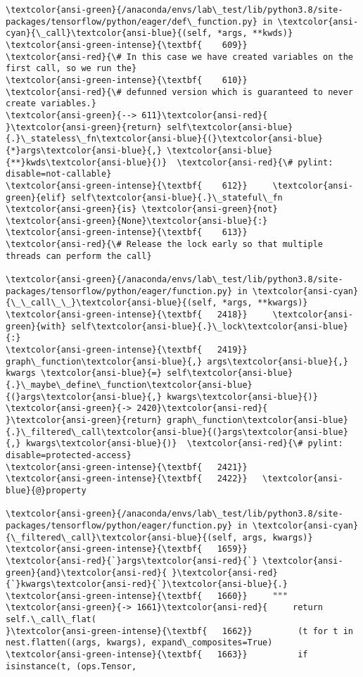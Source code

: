 \documentclass[11pt]{article}
\begin{document}
\begin{Verbatim}[commandchars=\\\{\}, frame=single, framerule=2mm, rulecolor=\color{outerrorbackground}]
\textcolor{ansi-green}{/anaconda/envs/lab\_test/lib/python3.8/site-packages/tensorflow/python/eager/def\_function.py} in \textcolor{ansi-cyan}{\_call}\textcolor{ansi-blue}{(self, *args, **kwds)}
\textcolor{ansi-green-intense}{\textbf{    609}}       \textcolor{ansi-red}{\# In this case we have created variables on the first call, so we run the}
\textcolor{ansi-green-intense}{\textbf{    610}}       \textcolor{ansi-red}{\# defunned version which is guaranteed to never create variables.}
\textcolor{ansi-green}{--> 611}\textcolor{ansi-red}{       }\textcolor{ansi-green}{return} self\textcolor{ansi-blue}{.}\_stateless\_fn\textcolor{ansi-blue}{(}\textcolor{ansi-blue}{*}args\textcolor{ansi-blue}{,} \textcolor{ansi-blue}{**}kwds\textcolor{ansi-blue}{)}  \textcolor{ansi-red}{\# pylint: disable=not-callable}
\textcolor{ansi-green-intense}{\textbf{    612}}     \textcolor{ansi-green}{elif} self\textcolor{ansi-blue}{.}\_stateful\_fn \textcolor{ansi-green}{is} \textcolor{ansi-green}{not} \textcolor{ansi-green}{None}\textcolor{ansi-blue}{:}
\textcolor{ansi-green-intense}{\textbf{    613}}       \textcolor{ansi-red}{\# Release the lock early so that multiple threads can perform the call}

\textcolor{ansi-green}{/anaconda/envs/lab\_test/lib/python3.8/site-packages/tensorflow/python/eager/function.py} in \textcolor{ansi-cyan}{\_\_call\_\_}\textcolor{ansi-blue}{(self, *args, **kwargs)}
\textcolor{ansi-green-intense}{\textbf{   2418}}     \textcolor{ansi-green}{with} self\textcolor{ansi-blue}{.}\_lock\textcolor{ansi-blue}{:}
\textcolor{ansi-green-intense}{\textbf{   2419}}       graph\_function\textcolor{ansi-blue}{,} args\textcolor{ansi-blue}{,} kwargs \textcolor{ansi-blue}{=} self\textcolor{ansi-blue}{.}\_maybe\_define\_function\textcolor{ansi-blue}{(}args\textcolor{ansi-blue}{,} kwargs\textcolor{ansi-blue}{)}
\textcolor{ansi-green}{-> 2420}\textcolor{ansi-red}{     }\textcolor{ansi-green}{return} graph\_function\textcolor{ansi-blue}{.}\_filtered\_call\textcolor{ansi-blue}{(}args\textcolor{ansi-blue}{,} kwargs\textcolor{ansi-blue}{)}  \textcolor{ansi-red}{\# pylint: disable=protected-access}
\textcolor{ansi-green-intense}{\textbf{   2421}} 
\textcolor{ansi-green-intense}{\textbf{   2422}}   \textcolor{ansi-blue}{@}property

\textcolor{ansi-green}{/anaconda/envs/lab\_test/lib/python3.8/site-packages/tensorflow/python/eager/function.py} in \textcolor{ansi-cyan}{\_filtered\_call}\textcolor{ansi-blue}{(self, args, kwargs)}
\textcolor{ansi-green-intense}{\textbf{   1659}}       \textcolor{ansi-red}{`}args\textcolor{ansi-red}{`} \textcolor{ansi-green}{and}\textcolor{ansi-red}{ }\textcolor{ansi-red}{`}kwargs\textcolor{ansi-red}{`}\textcolor{ansi-blue}{.}
\textcolor{ansi-green-intense}{\textbf{   1660}}     """
\textcolor{ansi-green}{-> 1661}\textcolor{ansi-red}{     return self.\_call\_flat(
}\textcolor{ansi-green-intense}{\textbf{   1662}}         (t for t in nest.flatten((args, kwargs), expand\_composites=True)
\textcolor{ansi-green-intense}{\textbf{   1663}}          if isinstance(t, (ops.Tensor,


\end{Verbatim}
\end{document}
